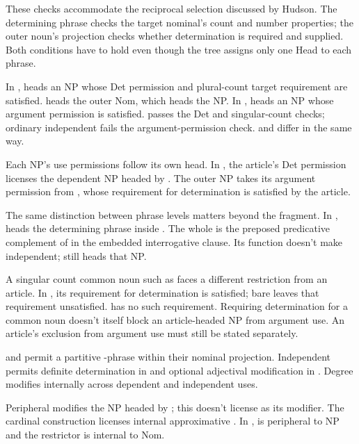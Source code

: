 \documentclass[12pt]{article}
\begin{document}
These checks accommodate the reciprocal selection discussed by Hudson. The determining phrase checks the target nominal's count and number properties; the outer noun's projection checks whether determination is required and supplied. Both conditions have to hold even though the tree assigns only one Head to each phrase.

In ,  heads an NP whose Det permission and plural-count target requirement are satisfied.  heads the outer Nom, which heads the NP. In ,  heads an NP whose argument permission is satisfied.  passes the Det and singular-count checks; ordinary independent  fails the argument-permission check.  and  differ in the same way.

Each NP's use permissions follow its own head. In , the article's Det permission licenses the dependent NP headed by . The outer NP takes its argument permission from , whose requirement for determination is satisfied by the article.

The same distinction between phrase levels matters beyond the fragment. In ,  heads the determining phrase inside . The whole  is the preposed predicative complement of  in the embedded interrogative clause. Its function doesn't make  independent;  still heads that NP.

A singular count common noun such as  faces a different restriction from an article. In , its requirement for determination is satisfied; bare  leaves that requirement unsatisfied.  has no such requirement. Requiring determination for a common noun doesn't itself block an article-headed NP from argument use. An article's exclusion from argument use must still be stated separately.

 and  permit a partitive -phrase within their nominal projection. Independent  permits definite determination in  and optional adjectival modification in . Degree  modifies  internally across dependent and independent uses.

Peripheral  modifies the NP headed by ; this doesn't license  as its modifier. The cardinal construction  licenses internal approximative . In ,  is peripheral to NP and the restrictor  is internal to Nom.
\end{document}
